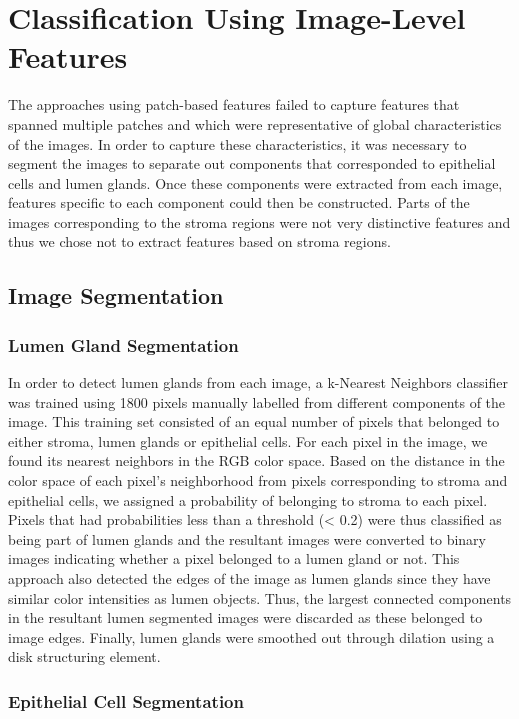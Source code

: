 \section{Classification Using Image-Level Features}
The approaches using patch-based features failed to capture features that spanned multiple patches and which were representative of global characteristics of the images. 
In order to capture these characteristics, it was necessary to segment the images to separate out components that corresponded to epithelial cells and lumen glands. 
Once these components were extracted from each image, features specific to each component could then be constructed. Parts of the images corresponding to the stroma regions were not very distinctive features and thus we chose not to extract features based on stroma regions.

\subsection{Image Segmentation}

\subsubsection{Lumen Gland Segmentation}

In order to detect lumen glands from each image, a k-Nearest Neighbors classifier was trained using 1800 pixels manually labelled from different components of the image. This training set consisted of an equal number of pixels that belonged to either stroma, lumen glands or epithelial cells. For each pixel in the image, we found its nearest neighbors in the RGB color space. Based on the distance in the color space of each pixel's neighborhood from pixels corresponding to stroma and epithelial cells, we assigned a probability of belonging to stroma to each pixel. Pixels that had probabilities less than a threshold (< 0.2) were thus classified as being part of lumen glands and the resultant images were converted to binary images indicating whether a pixel belonged to a lumen gland or not. This approach also detected the edges of the image as lumen glands since they have similar color intensities as lumen objects. Thus, the largest connected components in the resultant lumen segmented images were discarded as these belonged to image edges. Finally, lumen glands were smoothed out through dilation using a disk structuring element.

\subsubsection{Epithelial Cell Segmentation}


